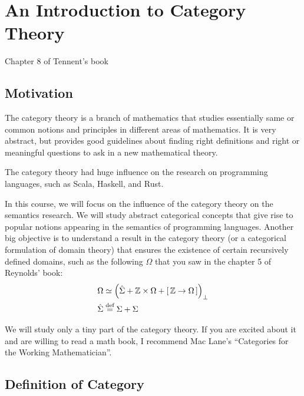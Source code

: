 \chapter{An Introduction to Category Theory}

Chapter 8 of Tennent's book

\section{Motivation}

\begin{enumcirc}
	\item
	The category theory is a branch of mathematics that studies essentially same or
	common notions and principles in different areas of mathematics.
	It is very abstract, but provides good guidelines about finding right
	definitions and right or meaningful questions to ask in a new mathematical
	theory.
	\item
	The category theory had huge influence on the research on programming
	languages, such as Scala, Haskell, and Rust.
	\item
	In this course, we will focus on the influence of the category theory on the
	semantics research.
	We will study abstract categorical concepts that give rise to popular notions
	appearing in the semantics of programming languages.
	Another big objective is to understand a result in the category theory (or a
	categorical formulation of domain theory) that ensures the existence of certain
	recursively defined domains, such as the following $\Omega$ that you saw in the
	chapter 5 of Reynolds' book:
	\begin{align*}
		\Omega       & \simeq \left( \hat{\Sigma} + \mathbb{Z} \times \Omega + \left[ \, \mathbb{Z} \to \Omega \, \right] \right)_\bot \\
		\hat{\Sigma} & \stackrel{\text{def}}{=} \Sigma + \Sigma
	\end{align*}
	\item
	We will study only a tiny part of the category theory.
	If you are excited about it and are willing to read a math book, I recommend
	Mac Lane's ``Categories for the Working Mathematician''.
\end{enumcirc}

\section{Definition of Category}

